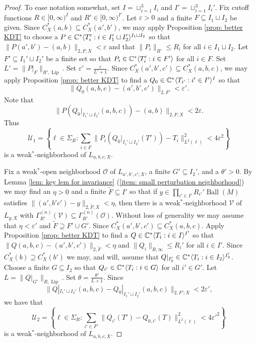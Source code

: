 \documentclass[10pt]{amsart}
\theoremstyle{definition}
\numberwithin{equation}{section}
\newcommand{\bC}{{\mathbb C}}
\newcommand{\cU}{{\mathcal U}}
\DeclareMathOperator{\Ball}{Ball}
\DeclareMathOperator{\Lip}{Lip}
\DeclarePairedDelimiter{\ip}{\langle}{\rangle}
\begin{document}
\begin{proof}
To ease notation somewhat, set $I=\sqcup_{i=1}^{3}I_{i}$ and $I'=\sqcup_{i=1}^{3}I_{i}'$.
 Fix cutoff functions $R\in [0,\infty)^{I}$ and $R'\in [0,\infty)^{I'}$. Let $\varepsilon>0$  and a finite $F\subseteq I_{1}\sqcup I_{2}$ be given. 
 Since $C^{*}_{X}(a,b)\subseteq C^{*}_{X}(a',b')$, we may apply Proposition \ref{prop: better KDT} to choose a $P\in \bC^{*}\ip{T_{i}':i\in I_{1}'\sqcup I_{2}'}^{I_{1}\sqcup I_{2}}$ so that $\|P(a',b')-(a,b)\|_{2,F;X}<\varepsilon$ and that $\|P_{i}\|_{R'}\leq R_{i}$ for all $i\in I_{1}\sqcup I_{2}$. Let $F'\subseteq I_{1}'\sqcup I_{2}'$ be a finite set so that $P_{i}\in \bC^{*}\ip{T_{i}':i\in F'}$ for all $i\in F$.  Set $L'=\|P|_{F}\|_{R',\Lip}$.  Set $\varepsilon'=\frac{\varepsilon}{L'+1}$. Since $C^{*}_{X}(a',b',c')\subseteq C^{*}_{X}(a,b,c)$, we may apply Proposition \ref{prop: better KDT} to find a $Q_{0}\in \bC^{*}\ip{T_{i'}:i'\in I'}^{I}$ so that 
 \[\|Q_{0}(a,b,c)-(a',b',c')\|_{2,F'}<\varepsilon'.\]
Note that
 \[\|P(Q_{0}|_{I_{1}'\sqcup I_{2}'}(a,b,c))-(a,b)\|_{2,F;X}<2\varepsilon.\]
 Thus 
 \[\cU_{1}=\left\{\ell\in \Sigma_{R}:\sum_{i\in F}\|P_{i}(Q_{0}|_{I_{1}'\sqcup I_{2}'}(T'))-T_{i}\|_{L^{2}(\ell)}^{2}<4\varepsilon^{2}\right\}\]
 is a weak$^{*}$-neighborhood of $L_{a,b,c;X}$. 

  Fix a weak$^{*}$-open neighborhood $\mathcal{O}$ of $L_{a',b',c';X}$, a finite $G'\subseteq I_{2}'$, and a $\theta'>0$. By Lemma \ref{lem: key lem for invariance} (\ref{item: small perturbation neighborhood}) we may find an $\eta>0$ and a finite $\widetilde{F}\subseteq I'$ so that if $y\in \prod_{i'\in I'}R_{i'}'\Ball(M)$ satisfies $\|(a',b'c')-y\|_{2,\widetilde{F};X}<\eta$, then there is a weak$^{*}$-neighborhood $\mathcal{V}$ of $L_{y;X}$ with $\Gamma^{(n)}_{R'}(\mathcal{V})\subseteq \Gamma^{(n)}_{R'}(\mathcal{O})$.
Without loss of generality we may assume that $\eta<\varepsilon'$ and $\widetilde{F}\supseteq F'\cup G'$.  Since $C^{*}_{X}(a',b',c')\subseteq C^{*}_{X}(a,b,c)$. Apply Proposition \ref{prop: better KDT} to find a $Q\in \bC^{*}\ip{T_{i}:i\in I}^{I'}$ so that $\|Q(a,b,c)-(a',b',c')\|_{2,\widetilde{F}}<\eta$ and $\|Q_{i}\|_{R,\infty}\leq R_{i}'$ for all $i\in I'$.
Since $C^{*}_{X}(b)\supseteq C^{*}_{X}(b')$ we may, and will, assume that $Q|_{I_{2}'}\in \bC^{*}\ip{T_{i}:i\in I_{2}}^{I_{2}'}$. Choose a finite $G\subseteq I_{2}$ so that $Q_{i'}\in \bC^{*}\ip{T_{i}:i\in G}$ for all $i'\in G'$. Let $L=\|Q|_{G'}\|_{R,\Lip}$. Set  $\theta=\frac{\theta'}{L+1}$. Since 
\[\|Q|_{I_{1}'\sqcup I_{2}'}(a,b,c)-Q_{0}|_{I_{1}'\sqcup I_{2}'}(a,b,c)\|_{2,F';X}<2\varepsilon',\]
we have that 
\[\cU_{2}=\left\{\ell\in \Sigma_{R}:\sum_{i'\in F'}\|Q_{i'}(T')-Q_{0,i'}(T)\|_{L^{2}(\ell)}^{2}<4\varepsilon'^{2}\right\}\]
is a weak$^{*}$-neighborhood of $L_{a,b,c;X}$. 


\end{proof}
\end{document}
